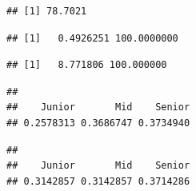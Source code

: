 \documentclass[
]{article}
\newenvironment{Shaded}{\begin{snugshade}}{\end{snugshade}}
\newcommand{\AttributeTok}[1]{\textcolor[rgb]{0.13,0.29,0.53}{#1}}
\newcommand{\ConstantTok}[1]{\textcolor[rgb]{0.56,0.35,0.01}{#1}}
\newcommand{\FunctionTok}[1]{\textcolor[rgb]{0.13,0.29,0.53}{\textbf{#1}}}
\newcommand{\NormalTok}[1]{#1}
\newcommand{\SpecialCharTok}[1]{\textcolor[rgb]{0.81,0.36,0.00}{\textbf{#1}}}
\begin{document}
\begin{verbatim}
## [1] 78.7021
\end{verbatim}

\begin{Shaded}
\end{Shaded}

\begin{verbatim}
## [1]   0.4926251 100.0000000
\end{verbatim}

\begin{Shaded}
\end{Shaded}

\begin{verbatim}
## [1]   8.771806 100.000000
\end{verbatim}

\begin{Shaded}
\end{Shaded}

\begin{verbatim}
## 
##    Junior       Mid    Senior 
## 0.2578313 0.3686747 0.3734940
\end{verbatim}

\begin{Shaded}
\end{Shaded}

\begin{verbatim}
## 
##    Junior       Mid    Senior 
## 0.3142857 0.3142857 0.3714286
\end{verbatim}
\end{document}
